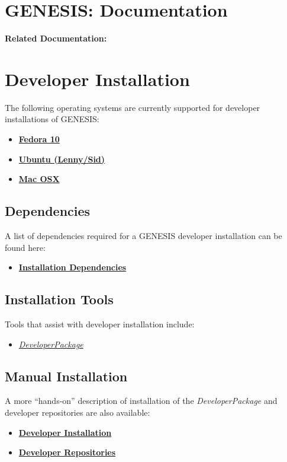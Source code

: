 \documentclass[12pt]{article}
\begin{document}
\section*{GENESIS: Documentation}

{\bf Related Documentation:}

\section*{Developer Installation}

The following operating systems are currently supported for developer installations of GENESIS:

\begin{itemize}
   \item[]\href{../installation-fedora10/installation-fedora10.tex}{\bf Fedora 10}
   \item[]\href{../installation-ubuntu-lennysid/installation-ubuntu-lennysid.tex}{\bf Ubuntu (Lenny/Sid)}
   \item[]\href{../installation-osx/installation-osx.tex}{\bf Mac OSX}
\end{itemize}

\subsection*{Dependencies}
A list of dependencies required for a GENESIS developer installation can be found here:
\begin{itemize}
   \item[]\href{../genesis-dependencies/genesis-dependencies.tex}{\bf Installation Dependencies}
\end{itemize}

\subsection*{Installation Tools}
Tools that assist with developer installation include:
\begin{itemize}
   \item[]\href{../developer-package/developer-package.tex}{\it DeveloperPackage}
\end{itemize}

\subsection*{Manual Installation}
A more ``hands-on'' description of installation of the {\it DeveloperPackage} and developer repositories are also available:
\begin{itemize}
\item \href{../installation-developer/installation-developer.tex}{\bf Developer Installation}
\item \href{../developer-repository/developer-repository.tex}{\bf Developer Repositories}
\end{itemize}
\end{document}
